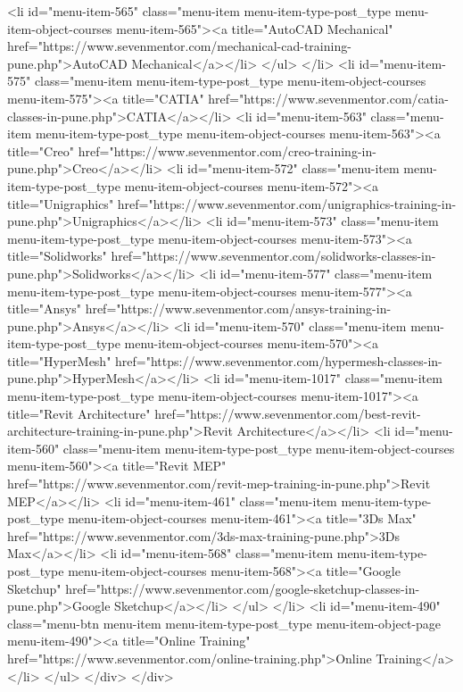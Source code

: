 {<li id="menu-item-565" class="menu-item menu-item-type-post_type menu-item-object-courses menu-item-565"><a title="AutoCAD Mechanical" href="https://www.sevenmentor.com/mechanical-cad-training-pune.php">AutoCAD Mechanical</a></li>
</ul>
</li>
<li id="menu-item-575" class="menu-item menu-item-type-post_type menu-item-object-courses menu-item-575"><a title="CATIA" href="https://www.sevenmentor.com/catia-classes-in-pune.php">CATIA</a></li>
<li id="menu-item-563" class="menu-item menu-item-type-post_type menu-item-object-courses menu-item-563"><a title="Creo" href="https://www.sevenmentor.com/creo-training-in-pune.php">Creo</a></li>
<li id="menu-item-572" class="menu-item menu-item-type-post_type menu-item-object-courses menu-item-572"><a title="Unigraphics" href="https://www.sevenmentor.com/unigraphics-training-in-pune.php">Unigraphics</a></li>
<li id="menu-item-573" class="menu-item menu-item-type-post_type menu-item-object-courses menu-item-573"><a title="Solidworks" href="https://www.sevenmentor.com/solidworks-classes-in-pune.php">Solidworks</a></li>
<li id="menu-item-577" class="menu-item menu-item-type-post_type menu-item-object-courses menu-item-577"><a title="Ansys" href="https://www.sevenmentor.com/ansys-training-in-pune.php">Ansys</a></li>
<li id="menu-item-570" class="menu-item menu-item-type-post_type menu-item-object-courses menu-item-570"><a title="HyperMesh" href="https://www.sevenmentor.com/hypermesh-classes-in-pune.php">HyperMesh</a></li>
<li id="menu-item-1017" class="menu-item menu-item-type-post_type menu-item-object-courses menu-item-1017"><a title="Revit Architecture" href="https://www.sevenmentor.com/best-revit-architecture-training-in-pune.php">Revit Architecture</a></li>
<li id="menu-item-560" class="menu-item menu-item-type-post_type menu-item-object-courses menu-item-560"><a title="Revit MEP" href="https://www.sevenmentor.com/revit-mep-training-in-pune.php">Revit MEP</a></li>
<li id="menu-item-461" class="menu-item menu-item-type-post_type menu-item-object-courses menu-item-461"><a title="3Ds Max" href="https://www.sevenmentor.com/3ds-max-training-pune.php">3Ds Max</a></li>
<li id="menu-item-568" class="menu-item menu-item-type-post_type menu-item-object-courses menu-item-568"><a title="Google Sketchup" href="https://www.sevenmentor.com/google-sketchup-classes-in-pune.php">Google Sketchup</a></li>
</ul>
</li>
<li id="menu-item-490" class="menu-btn menu-item menu-item-type-post_type menu-item-object-page menu-item-490"><a title="Online Training" href="https://www.sevenmentor.com/online-training.php">Online Training</a></li>
</ul>
</div>
</div>

}
